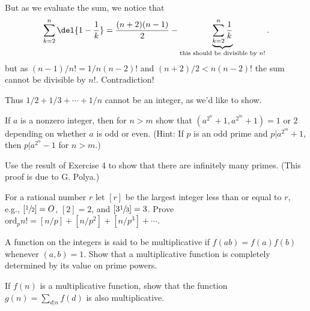 \documentclass[english]{IMTexam}
\begin{document}
\begin{questions}
\begin{solution}
			But as we evaluate the sum, we notice that
			\[ \sum_{k=2}^{n}\del{1-\dfrac{1}{k}}=\dfrac{(n+2)(n-1)}{2}-\underbrace{\sum_{k=2}^{n}\dfrac{1}{k}}_{\text{this should be divisible by $ n! $}}. \]
			but as $ (n-1)/n! =1/n(n-2)! $ and $ (n+2)/2<n(n-2)! $ the sum cannot be divisible by $ n! $. Contradiction!
			
			Thus $ 1/2+1/3+\cdots+1/n $ cannot be an integer, as we'd like to show.
		\end{solution}
		
		\question\label{ques:IR:2.4} If $ a $ is a nonzero integer, then for $ n > m $ show that $ (a^{2^{n}} + 1, a^{2^{m}} + 1) = 1 $ or $ 2 $ depending on whether $ a $ is odd or even. (Hint: If $ p $ is an odd prime and $ p|a^{2^{m}} + 1 $, then $ p|a^{2^{n}} - 1 $ for $ n > m $.)
		
		\begin{solution}
			
		\end{solution}
		
		\question\label{ques:IR:2.5} Use the result of Exercise 4 to show that there are infinitely many primes. (This proof is due to G. Polya.)
		
		\begin{solution}
			
		\end{solution}
		
		\question\label{ques:IR:2.6} For a rational number $ r $ let $ [r] $ be the largest integer less than or equal to $ r $, e.g., $ [\sfrac{1}{2}] = O $, $ [2] = 2 $, and $ [3\sfrac{1}{3}] = 3 $. Prove $ \mathrm{ord}_p n! = [n/p] + [n/p^{2}] + [n/p^{3}] + \cdots $.
		
		\begin{solution}
			
		\end{solution}
		
		\question\label{ques:IR:2.9} A function on the integers is said to be multiplicative if $ f(ab) = f(a)f(b) $ whenever $ (a, b) = 1 $. Show that a multiplicative function is completely determined by its value on prime powers.
		
		\begin{solution}
			
		\end{solution}
		
		\question\label{ques:IR:2.10} If $ f(n) $ is a multiplicative function, show that the function $ g(n) = \sum_{d|n} f(d) $ is also multiplicative.
		

\end{questions}
\end{document}
